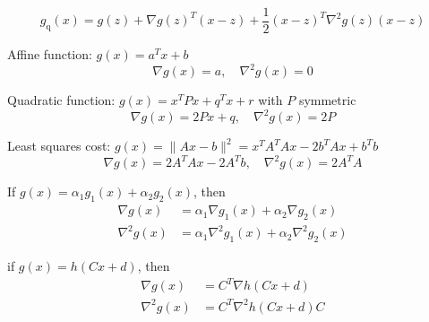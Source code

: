 \begin{definition}
    \begin{equation} g_{\mathrm{q}}(x)=g(z)+\nabla g(z)^{T}(x-z)+\frac{1}{2}(x-z)^{T} \nabla^{2} g(z)(x-z) \end{equation}
\end{definition}

\begin{example}
    Affine function: $ g(x)=a^{T} x+b $
\begin{equation}
\nabla g(x)=a, \quad \nabla^{2} g(x)=0
\end{equation}

Quadratic function: $ g(x)=x^{T} P x+q^{T} x+r $ with $ P $ symmetric
\begin{equation}
\nabla g(x)=2 P x+q, \quad \nabla^{2} g(x)=2 P
\end{equation}

Least squares cost: $ g(x)=\|A x-b\|^{2}=x^{T} A^{T} A x-2 b^{T} A x+b^{T} b $
\begin{equation}
\nabla g(x)=2 A^{T} A x-2 A^{T} b, \quad \nabla^{2} g(x)=2 A^{T} A
\end{equation}
\end{example}

\begin{theorem}
    If $ g(x)=\alpha_{1} g_{1}(x)+\alpha_{2} g_{2}(x) $, then
\begin{equation}
\begin{aligned}
\nabla g(x) &=\alpha_{1} \nabla g_{1}(x)+\alpha_{2} \nabla g_{2}(x) \\
\nabla^{2} g(x) &=\alpha_{1} \nabla^{2} g_{1}(x)+\alpha_{2} \nabla^{2} g_{2}(x)
\end{aligned}
\end{equation}
\end{theorem}

\begin{theorem}
    if $ g(x)=h(C x+d) $, then
\begin{equation}
\begin{aligned}
\nabla g(x) &=C^{T} \nabla h(C x+d) \\
\nabla^{2} g(x) &=C^{T} \nabla^{2} h(C x+d) C
\end{aligned}
\end{equation}
\end{theorem}

